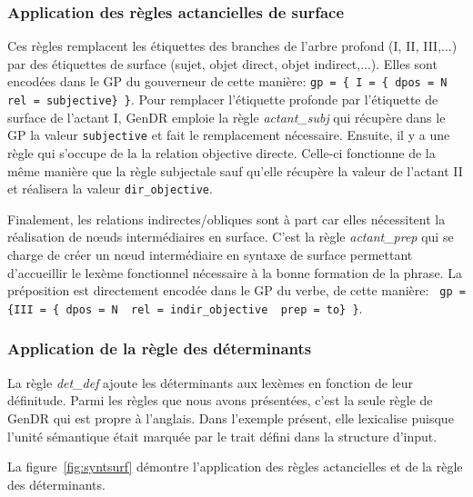 \subsubsection{Application des règles actancielles de surface}
Ces règles remplacent les étiquettes des branches de l'arbre profond (I, II, III,...) par des étiquettes de surface (sujet, objet direct, objet indirect,...). Elles sont encodées dans le \ac{GP} du gouverneur de cette manière: \lstinline|gp = { I = { dpos = N rel = subjective} }|. Pour remplacer l'étiquette profonde par l'étiquette de surface de l'actant I, GenDR emploie la règle \emph{actant\_subj} qui récupère dans le \ac{GP} la valeur \texttt{subjective} et fait le remplacement nécessaire. Ensuite, il y a une règle qui s'occupe de la la relation objective directe. Celle-ci fonctionne de la même manière que la règle subjectale sauf qu'elle récupère la valeur de l'actant II et réalisera la valeur \texttt{dir\_objective}. 

Finalement, les relations indirectes/obliques sont à part car elles nécessitent la réalisation de n\oe{}uds intermédiaires en surface. C'est la règle \emph{actant\_prep} qui se charge de créer un n\oe{}ud intermédiaire en syntaxe de surface permettant d'accueillir le lexème fonctionnel nécessaire à la bonne formation de la phrase. La préposition est directement encodée dans le \ac{GP} du verbe, de cette manière: \lstinline! gp = {III = { dpos = N  rel = indir_objective  prep = to} }!.

\subsubsection{Application de la règle des déterminants}

La règle \emph{det\_def} ajoute les déterminants aux lexèmes en fonction de leur définitude. Parmi les règles que nous avons présentées, c'est la seule règle de GenDR qui est propre à l'anglais. Dans l'exemple présent, elle lexicalise  puisque l'unité sémantique  était marquée par le trait défini dans la structure d'input.

La figure~\ref{fig:syntsurf} démontre l'application des règles actancielles et de la règle des déterminants.

